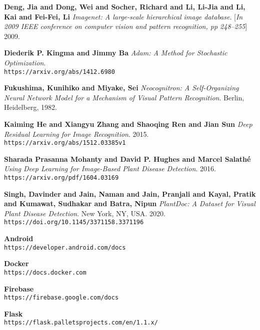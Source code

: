 \documentclass[../Report.tex]{subfiles}
\begin{document}
\begin{thebibliography}{9}

    \textbf{Deng, Jia and Dong, Wei and Socher, Richard and Li, Li-Jia and Li, Kai and Fei-Fei, Li}
    \textit{Imagenet: A large-scale hierarchical image database}. 
    [\textit{In 2009 IEEE conference on computer vision and pattern recognition, pp 248--255}] 2009.
    
    \textbf{Diederik P. Kingma and Jimmy Ba}
    \textit{Adam: A Method for Stochastic Optimization}.
    \\\texttt{https://arxiv.org/abs/1412.6980}

    \textbf{Fukushima, Kunihiko and Miyake, Sei}
    \textit{Neocognitron: A Self-Organizing Neural Network Model for a Mechanism of Visual Pattern Recognition}. 
    Berlin, Heidelberg, 1982.

    \textbf{Kaiming He and Xiangyu Zhang and Shaoqing Ren and Jian Sun}
    \textit{Deep Residual Learning for Image Recognition}. 2015.
    \\\texttt{https://arxiv.org/abs/1512.03385v1}
    
    \textbf{Sharada Prasanna Mohanty and David P. Hughes and Marcel Salath{\'{e}}}
    \textit{Using Deep Learning for Image-Based Plant Disease Detection}. 2016.
    \\\texttt{https://arxiv.org/pdf/1604.03169}

    \textbf{Singh, Davinder and Jain, Naman and Jain, Pranjali and Kayal, Pratik and Kumawat, Sudhakar and Batra, Nipun}
    \textit{PlantDoc: A Dataset for Visual Plant Disease Detection}.
    New York, NY, USA. 2020.
    \\\texttt{https://doi.org/10.1145/3371158.3371196}

    \textbf{Android}
    \\\texttt{https://developer.android.com/docs}

    \textbf{Docker}
    \\\texttt{https://docs.docker.com}

    \textbf{Firebase}
    \\\texttt{https://firebase.google.com/docs}

    \textbf{Flask}
    \\\texttt{https://flask.palletsprojects.com/en/1.1.x/}


\end{thebibliography}
\end{document}

